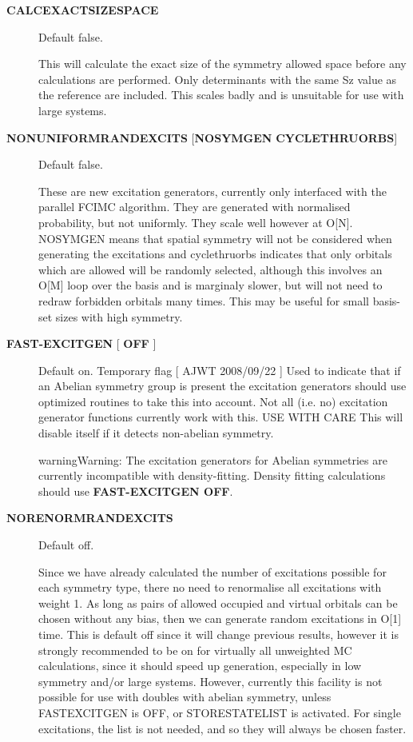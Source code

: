 \documentclass[openany,a4paper,10pt,english]{manual}
\begin{document}
\begin{description}
\item[\textbf{CALCEXACTSIZESPACE}] \leavevmode
Default false.

This will calculate the exact size of the symmetry allowed space before any calculations
are performed. Only determinants with the same Sz value as the reference are included.
This scales badly and is unsuitable for use with large systems.

\item[\textbf{NONUNIFORMRANDEXCITS} {[}\textbf{NOSYMGEN} \textbar{} \textbf{CYCLETHRUORBS}{]}] \leavevmode
Default false.

These are new excitation generators, currently only interfaced with the parallel
FCIMC algorithm. They are generated with normalised probability, but not uniformly.
They scale well however at O{[}N{]}. NOSYMGEN means that spatial symmetry will not
be considered when generating the excitations and cyclethruorbs indicates that
only orbitals which are allowed will be randomly selected, although this involves
an O{[}M{]} loop over the basis and is marginaly slower, but will not need to redraw
forbidden orbitals many times. This may be useful for small basis-set sizes with
high symmetry.

\item[\textbf{FAST-EXCITGEN}  {[} \textbf{OFF} {]}] \leavevmode
Default on.  Temporary flag {[} AJWT 2008/09/22 {]}
Used to indicate that if an Abelian symmetry group is present
the excitation generators should use optimized routines
to take this into account.  Not all (i.e. no) excitation generator functions
currently work with this.  USE WITH CARE
This will disable itself if it detects non-abelian symmetry.

\begin{notice}{warning}{Warning:}
The excitation generators for Abelian symmetries are currently incompatible
with density-fitting.  Density fitting calculations should use \textbf{FAST-EXCITGEN OFF}.
\end{notice}

\item[\textbf{NORENORMRANDEXCITS}] \leavevmode
Default off.

Since we have already calculated the number of excitations possible for each symmetry type, there
no need to renormalise all excitations with weight 1. As long as pairs of allowed occupied and
virtual orbitals can be chosen without any bias, then we can generate random excitations in O{[}1{]} time.
This is default off since it will change previous results, however it is strongly recommended to be
on for virtually all unweighted MC calculations, since it should speed up generation, especially in
low symmetry and/or large systems. However, currently this facility is not possible for use with doubles
with abelian symmetry, unless FASTEXCITGEN is OFF, or STORESTATELIST is activated. For single excitations,
the list is not needed, and so they will always be chosen faster.


\end{description}
\end{document}

